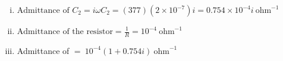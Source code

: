 \begin{enumerate}[(i)]

\item
  $\text{Admittance of $C_2$} = i\omega C_2 = (377)(2\times 10^{-7})i 
                               = 0.754\times 10^{-4}i\ \text{ohm}^{-1}$

\item $\text{Admittance of the resistor} = \frac{1}{R} = 10^{-4}\ \text{ohm}^{-1}$

\item Admittance of 
         $=\ 10^{-4}(1+0.754i)\ \text{ohm}^{-1}$


\end{enumerate}
